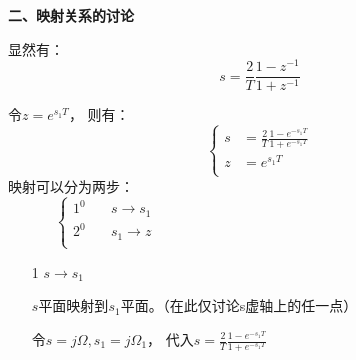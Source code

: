 \documentclass[notheorems,compress,mathserif,table]{beamer}
\begin{document}
\begin{frame}[allowframebreaks]\frametitle{}%
\textbf{二、映射关系的讨论}

    显然有：
    $$s=\frac{2}{T}\frac{1-z^{-1}}{1+z^{-1}}$$
    \par 令$z=e^{s_{1}T}$，
    则有：
    $$
      \left\{ \begin{aligned}
        s  &=\frac{2}{T}\frac{1-e^{-s_1 T}}{1+e^{-s_1 T}}\\
        z  &=e^{s_{1}T}\\
      \end{aligned} \right.
    $$
    映射可以分为两步：
    $$
      \left\{ \begin{aligned}
        1^0 &\quad  \mbox{$s \longrightarrow s_1$}\quad\quad\quad\quad
        \quad\quad\quad\quad\quad\quad\quad\quad\quad\quad\quad\quad
        \quad\quad\quad\quad\quad\quad\\
        2^0 &\quad  \mbox{$s_1 \longrightarrow z$}\\
      \end{aligned} \right.
    $$
    \begin{enumerate}
\newpage
      \item [1] $s \longrightarrow s_1\quad\quad$\par
          $s$平面映射到$s_1$平面。（在此仅讨论s虚轴上的任一点）

          令$s=j\Omega,s_1 = j\Omega_1$，
          代入$s=\frac{2}{T}\frac{1-e^{-s_1 T}}{1+e^{-s_1 T}}$


\end{enumerate}
\end{frame}
\end{document}
